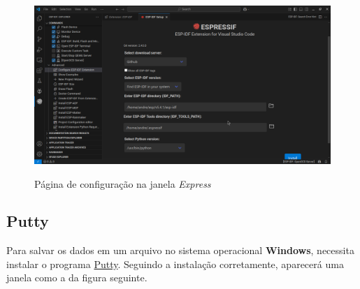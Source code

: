 \begin{figure}[!ht]
    \centering
    \caption{Página de configuração na janela \textit{Express}}
    \vspace{0.2cm}
    \includegraphics[scale=0.2]{img/VSCodeESP-IDF_CONFIGURE_02.png}
    \label{fig:ESPIDFConfigExpress}
\end{figure}

\subsection{Putty}

\tab
Para salvar os dados em um arquivo no sistema 
operacional \textbf{Windows}, necessita instalar o 
programa \href{https://www.chiark.greenend.org.uk/~sgtatham/putty/latest.html}{Putty}.
Seguindo a instalação corretamente, aparecerá uma janela
como a da figura seguinte.

